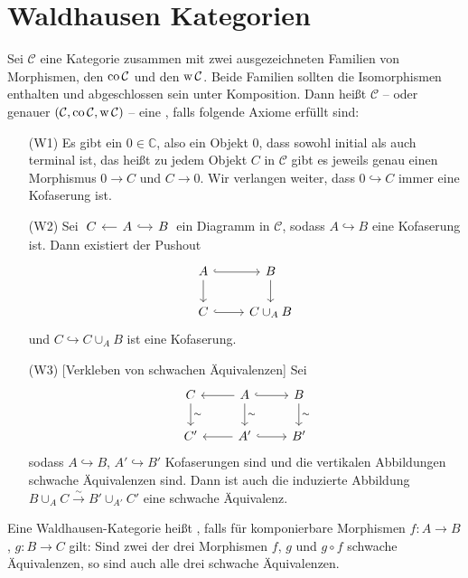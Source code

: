 \section{Waldhausen Kategorien} %
\label{sec:5}

\begin{definition}[{name=[{Waldhausen Kategorie}]}]
	Sei $\mathcal{C}$ eine Kategorie zusammen mit zwei ausgezeichneten Familien von Morphismen, den  $\operatorname{co} \mathcal{C}$ und den  $\operatorname{w} \mathcal{C}$.
	Beide Familien sollten die Isomorphismen enthalten und abgeschlossen sein unter Komposition.
	Dann heißt $\mathcal{C}$ -- oder genauer $(\mathcal{C},\operatorname{co} \mathcal{C},\operatorname{w} \mathcal{C})$ -- eine , falls folgende Axiome erfüllt sind:
	\begin{enumerate}[(i)]
		\item[(W1)] Es gibt ein  $0 \in \mathbb{C}$, also ein Objekt $0$, dass sowohl initial als auch terminal ist, das heißt zu jedem Objekt $C$ in $\mathcal{C}$ gibt es jeweils genau einen Morphismus $0 \to C$ und $C \to 0$. 
		Wir verlangen weiter, dass $0 \hookrightarrow C$ immer eine Kofaserung ist.
		\item[(W2)] Sei $\!\begin{tikzcd}[sep=small] C & A \lar \rar[hook] & B \end{tikzcd}\!$ ein Diagramm in $\mathcal{C}$, sodass $A \hookrightarrow B$ eine Kofaserung ist.
		Dann existiert der Pushout
		\[
			\begin{tikzcd}
				A \rar[hook] \dar & B \dar  \\
				C \rar[hook] & C \cup_A B
			\end{tikzcd}
		\]
		und $C \hookrightarrow C \cup_A B$ ist eine Kofaserung.
		\item[(W3)] [Verkleben von schwachen Äquivalenzen] Sei 
		\[
			\begin{tikzcd}
				C \dar["\sim"] & A \lar \dar["\sim"] \rar[hook] & B \dar["\sim"] \\
				C' & A' \lar \rar[hook] & B'
			\end{tikzcd}
		\] 
		sodass $A \hookrightarrow B$, $A' \hookrightarrow B'$ Kofaserungen sind und die vertikalen Abbildungen schwache Äquivalenzen sind.
		Dann ist auch die induzierte Abbildung $B \cup_A C \xrightarrow{\sim} B' \cup_{A'} C'$ eine schwache Äquivalenz.
	\end{enumerate}
	Eine Waldhausen-Kategorie heißt , falls für komponierbare Morphismen $f \colon A \to B$, $g \colon B \to C$ gilt:
	Sind zwei der drei Morphismen $f$, $g$ und $ g \circ f$ schwache Äquivalenzen, so sind auch alle drei schwache Äquivalenzen.
\end{definition}

